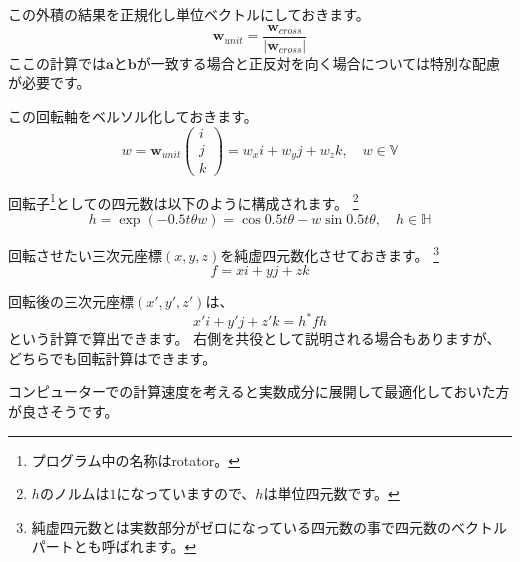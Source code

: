 \documentclass[a4paper,12pt,notitlepage]{jsreport}
\begin{document}
この外積の結果を正規化し単位ベクトルにしておきます。
\begin{equation}
\bm{w}_{unit}=\frac{\bm{w}_{cross}}{|\bm{w}_{cross}|}
\end{equation}
ここの計算では$\bm{a}$と$\bm{b}$が一致する場合と正反対を向く場合については特別な配慮が必要です。

この回転軸をベルソル化しておきます。
\begin{equation}
w=\bm{w}_{unit}\begin{pmatrix}i\\j\\k\end{pmatrix}=w_xi+w_yj+w_zk,\quad w\in\mathbb{V}
\end{equation}

回転子\footnote{プログラム中の名称はrotator。}としての四元数は以下のように構成されます。
\footnote{$h$のノルムは$1$になっていますので、$h$は単位四元数です。}
\begin{equation}
h=\exp(-0.5t\theta w)=\cos 0.5t\theta-w\sin 0.5t\theta,\quad h\in\mathbb{H}
\end{equation}

回転させたい三次元座標$(x,y,z)$を純虚四元数化させておきます。
\footnote{純虚四元数とは実数部分がゼロになっている四元数の事で四元数のベクトルパートとも呼ばれます。}
\begin{equation}
f=xi+yj+zk
\end{equation}

回転後の三次元座標$(x',y',z')$は、
\begin{equation}
x'i+y'j+z'k=h^*fh
\end{equation}
という計算で算出できます。
右側を共役として説明される場合もありますが、どちらでも回転計算はできます。

コンピューターでの計算速度を考えると実数成分に展開して最適化しておいた方が良さそうです。
\end{document}

